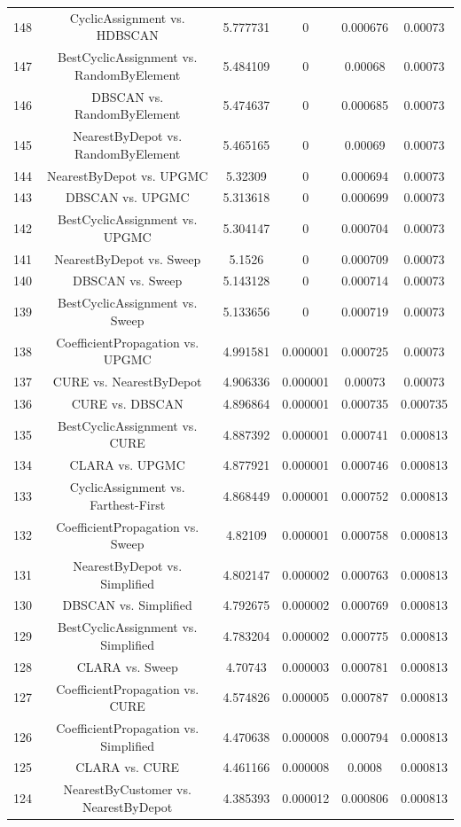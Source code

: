 \documentclass[a4paper,10pt]{article}
\begin{document}
\begin{landscape}
\begin{table}[!htp]
\begin{tabular}{cccccc}
148&CyclicAssignment vs. HDBSCAN&5.777731&0&0.000676&0.00073\\
147&BestCyclicAssignment vs. RandomByElement&5.484109&0&0.00068&0.00073\\
146&DBSCAN vs. RandomByElement&5.474637&0&0.000685&0.00073\\
145&NearestByDepot vs. RandomByElement&5.465165&0&0.00069&0.00073\\
144&NearestByDepot vs. UPGMC&5.32309&0&0.000694&0.00073\\
143&DBSCAN vs. UPGMC&5.313618&0&0.000699&0.00073\\
142&BestCyclicAssignment vs. UPGMC&5.304147&0&0.000704&0.00073\\
141&NearestByDepot vs. Sweep&5.1526&0&0.000709&0.00073\\
140&DBSCAN vs. Sweep&5.143128&0&0.000714&0.00073\\
139&BestCyclicAssignment vs. Sweep&5.133656&0&0.000719&0.00073\\
138&CoefficientPropagation vs. UPGMC&4.991581&0.000001&0.000725&0.00073\\
137&CURE vs. NearestByDepot&4.906336&0.000001&0.00073&0.00073\\
136&CURE vs. DBSCAN&4.896864&0.000001&0.000735&0.000735\\
135&BestCyclicAssignment vs. CURE&4.887392&0.000001&0.000741&0.000813\\
134&CLARA vs. UPGMC&4.877921&0.000001&0.000746&0.000813\\
133&CyclicAssignment vs. Farthest-First&4.868449&0.000001&0.000752&0.000813\\
132&CoefficientPropagation vs. Sweep&4.82109&0.000001&0.000758&0.000813\\
131&NearestByDepot vs. Simplified&4.802147&0.000002&0.000763&0.000813\\
130&DBSCAN vs. Simplified&4.792675&0.000002&0.000769&0.000813\\
129&BestCyclicAssignment vs. Simplified&4.783204&0.000002&0.000775&0.000813\\
128&CLARA vs. Sweep&4.70743&0.000003&0.000781&0.000813\\
127&CoefficientPropagation vs. CURE&4.574826&0.000005&0.000787&0.000813\\
126&CoefficientPropagation vs. Simplified&4.470638&0.000008&0.000794&0.000813\\
125&CLARA vs. CURE&4.461166&0.000008&0.0008&0.000813\\
124&NearestByCustomer vs. NearestByDepot&4.385393&0.000012&0.000806&0.000813\\

\end{tabular}
\end{table}
\end{landscape}
\end{document}
